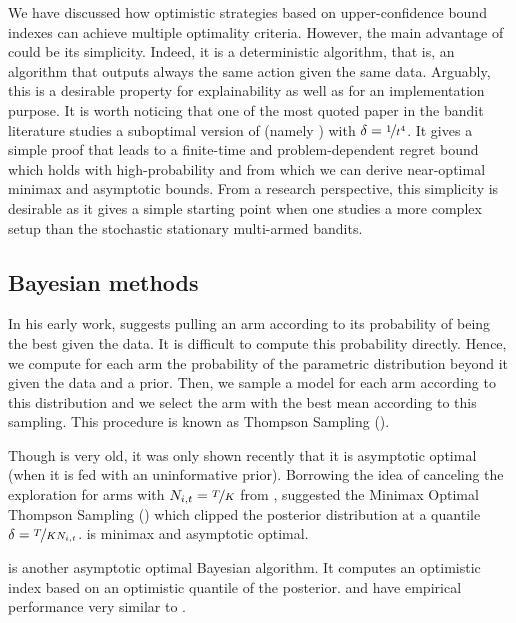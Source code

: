 {We have discussed how optimistic strategies based on upper-confidence bound indexes can achieve multiple optimality criteria. However, the main advantage of \UCB could be its simplicity. Indeed, it is a deterministic algorithm, that is, an algorithm that outputs always the same action given the same data. Arguably, this is a desirable property for explainability as well as for an implementation purpose. It is worth noticing that one of the most quoted paper \citep{auer2002finite} in the bandit literature studies a suboptimal version of \UCB (namely \UCBone)  with $\delta = \nicefrac{1}{t^4}$. It gives a simple proof that leads to a finite-time and problem-dependent regret bound which holds with high-probability and from which we can derive near-optimal minimax and asymptotic bounds. From a research perspective, this simplicity is desirable as it gives a simple starting point when one studies a more complex setup than the stochastic stationary multi-armed bandits.


\subsection{Bayesian methods}
\label{ss:bayes}

In his early work, \citet{thompson1933likelihood} suggests pulling an arm according to its probability of being the best given the data. It is difficult to compute this probability directly. Hence, we compute for each arm the probability of the parametric distribution beyond it given the data and a prior. Then, we sample a model for each arm according to this distribution and we select the arm with the best mean according to this sampling. This procedure is known as Thompson Sampling (\TS).

Though \TS is very old, it was only shown recently \citep{kaufmann2012ts, agrawal2013finite} that it is asymptotic optimal (when it is fed with an uninformative prior). Borrowing the idea of canceling the exploration for arms with $N_{i,t} = \nicefrac{T}{K}$ from \MOSS, \citet{jin2020mots} suggested the Minimax Optimal Thompson Sampling (\MOTS) which clipped the posterior distribution at a quantile $\delta = \nicefrac{T}{KN_{i,t}}$. \MOTS is minimax and asymptotic optimal. 

\BayesUCB \citep{kaufmann2012bayesian} is another asymptotic optimal Bayesian algorithm. It computes an optimistic index based on an optimistic quantile of the posterior. \BayesUCB and \TS have empirical performance very similar to \KLUCB.

}
